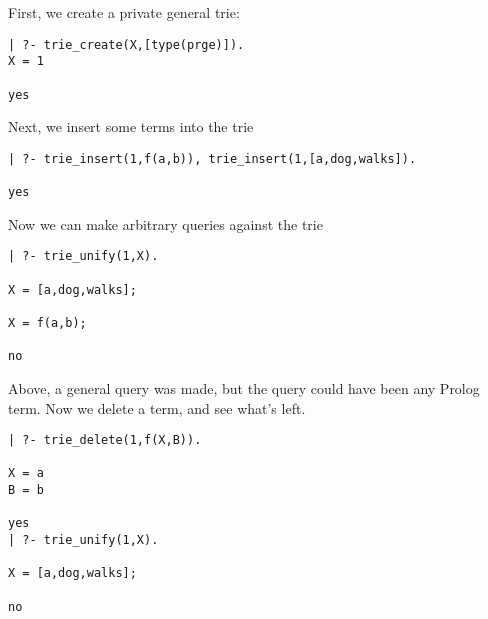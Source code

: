 \begin{example} \rm
First, we create a private general trie: 
{\small
\begin{verbatim}
| ?- trie_create(X,[type(prge)]).
X = 1

yes
\end{verbatim}
}
%
Next, we insert some terms into the trie
{\small
\begin{verbatim}
| ?- trie_insert(1,f(a,b)), trie_insert(1,[a,dog,walks]).

yes
\end{verbatim}
}
Now we can make arbitrary queries against the trie
{\small
\begin{verbatim}
| ?- trie_unify(1,X).

X = [a,dog,walks];

X = f(a,b);

no
\end{verbatim}
}
\noindent
Above, a general query was made, but the query could have been any
Prolog term.  Now we delete a term, and see what's left.
{\small
\begin{verbatim}
| ?- trie_delete(1,f(X,B)).

X = a
B = b

yes
| ?- trie_unify(1,X).

X = [a,dog,walks];

no
\end{verbatim}
}
\end{example}

